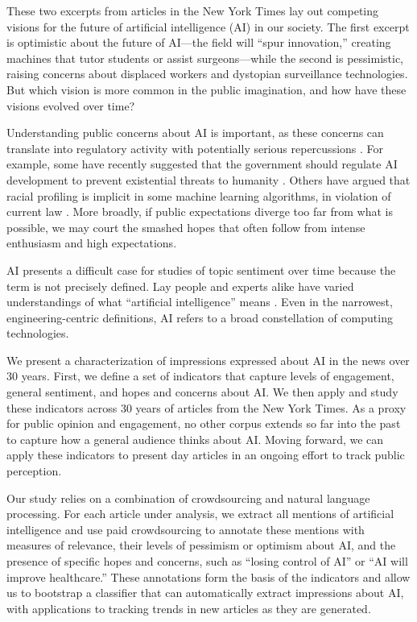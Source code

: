 \documentclass[letterpaper]{article}
\begin{document}
These two excerpts from articles in the New York Times lay out competing visions for the future of artificial intelligence (AI) in our society. The first excerpt is optimistic about the future of AI---the field will ``spur innovation,'' creating machines that tutor students or assist surgeons---while the second is pessimistic, raising concerns about displaced workers and dystopian surveillance technologies. But which vision is more common in the public imagination, and how have these visions evolved over time?

Understanding public concerns about AI is important, as these concerns can translate into regulatory activity with potentially serious repercussions \cite{ai100}. For example, some have recently suggested that the government should regulate AI development to prevent existential threats to humanity \cite{elon-regulatory}. Others have argued that racial profiling is implicit in some machine learning algorithms, in violation of current law \cite{machine-bias}. More broadly, if public expectations diverge too far from what is possible, we may court the smashed hopes that often follow from intense enthusiasm and high expectations.

AI presents a difficult case for studies of topic sentiment over time because the term is not precisely defined. Lay people and experts alike have varied understandings of what ``artificial intelligence'' means \cite{ai100}.  Even in the narrowest, engineering-centric definitions, AI refers to a broad constellation of computing technologies.

We present a characterization of impressions expressed about AI in the news over 30 years. First, we define a set of indicators that capture levels of engagement, general sentiment, and hopes and concerns about AI. We then apply and study these indicators across 30 years of articles from the New York Times. As a proxy for public opinion and engagement, no other corpus extends so far into the past to capture how a general audience thinks about AI. Moving forward, we can apply these indicators to present day articles in an ongoing effort to track public perception.

Our study relies on a combination of crowdsourcing and natural language processing. For each article under analysis, we extract all mentions of artificial intelligence and use paid crowdsourcing to annotate these mentions with measures of relevance, their levels of pessimism or optimism about AI, and the presence of specific hopes and concerns, such as ``losing control of AI'' or ``AI will improve healthcare.'' These annotations form the basis of the indicators and allow us to bootstrap a classifier that can automatically extract impressions about AI, with applications to tracking trends in new articles as they are generated.
\end{document}
